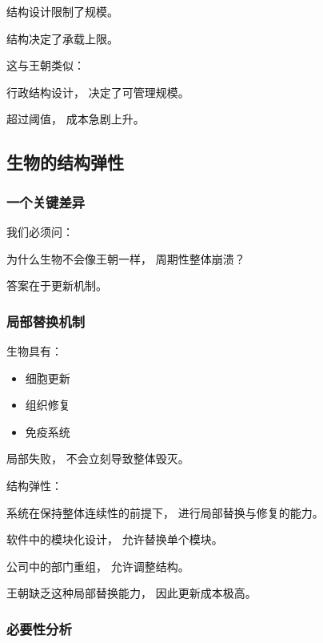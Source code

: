 \documentclass[../main.tex]{subfiles}
\begin{document}
结构设计限制了规模。

\begin{readingnote}
	结构决定了承载上限。
\end{readingnote}

这与王朝类似：

行政结构设计，
决定了可管理规模。

超过阈值，
成本急剧上升。

\subsection{生物的结构弹性}

\subsubsection{一个关键差异}

我们必须问：

\begin{questionbox}
	为什么生物不会像王朝一样，
	周期性整体崩溃？
\end{questionbox}

答案在于更新机制。

\subsubsection{局部替换机制}

生物具有：

\begin{itemize}
	\item 细胞更新
	\item 组织修复
	\item 免疫系统
\end{itemize}

局部失败，
不会立刻导致整体毁灭。

\begin{definitionbox}
	结构弹性：
	
	系统在保持整体连续性的前提下，
	进行局部替换与修复的能力。
\end{definitionbox}

软件中的模块化设计，
允许替换单个模块。

公司中的部门重组，
允许调整结构。

王朝缺乏这种局部替换能力，
因此更新成本极高。

\subsubsection{必要性分析}
\end{document}
